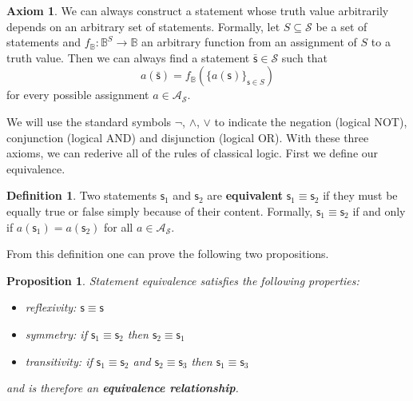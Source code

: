 \documentclass[%
reprint,
amsmath,amssymb,
aps,
prx,
]{revtex4-1}
\theoremstyle{plain}%
\newtheorem{prop}[thrm]{Proposition}
\theoremstyle{definition}
\newtheorem{defn}[thrm]{Definition}
\newtheorem{axiom}[thrm]{Axiom}
\theoremstyle{remark}
\def\Bool{\mathbb{B}}
\def\AND{\wedge}
\def\OR{\vee}
\def\NOT{\neg}
\newcommand{\stmt}[1][s] {\mathsf{#1}}
\def\logCtx{\mathcal{S}}
\newcommand{\pAss}[1][\mathcal{S}] {\mathcal{A}_{#1}}
\begin{document}
\begin{axiom}\label{ax_functions_of_statement}
	We can always construct a statement whose truth value arbitrarily depends on an arbitrary set of statements. Formally, let $S \subseteq \logCtx$ be a set of statements and $f_{\Bool} : \Bool^S \to \Bool$ an arbitrary function from an assignment of $S$ to a truth value. Then we can always find a statement $\bar{\stmt} \in \logCtx$ such that
	$$a(\bar{\stmt}) = f_{\Bool}(\{a(\stmt)\}_{\stmt \in S})$$
	for every possible assignment $a \in \pAss$.
\end{axiom}

We will use the standard symbols $\NOT$, $\AND$, $\OR$ to indicate the negation (logical NOT), conjunction (logical AND) and disjunction (logical OR). With these three axioms, we can rederive all of the rules of classical logic. First we define our equivalence.

\begin{defn}
	Two statements $\stmt_1$ and $\stmt_2$ are \textbf{equivalent} $\stmt_1 \equiv \stmt_2$ if they must be equally true or false simply because of their content. Formally, $\stmt_1 \equiv \stmt_2$ if and only if $a(\stmt_1) = a(\stmt_2)$ for all $a \in \pAss$.
\end{defn}

From this definition one can prove the following two propositions.

\begin{prop}
	Statement equivalence satisfies the following properties:
	\begin{itemize}
		\item reflexivity: $\stmt \equiv \stmt$
		\item symmetry: if $\stmt_1 \equiv \stmt_2$ then $\stmt_2 \equiv \stmt_1$
		\item transitivity: if $\stmt_1 \equiv \stmt_2$ and $\stmt_2 \equiv \stmt_3$ then $\stmt_1 \equiv \stmt_3$
	\end{itemize}
	and is therefore an \textbf{equivalence relationship}.
\end{prop}
\end{document}
